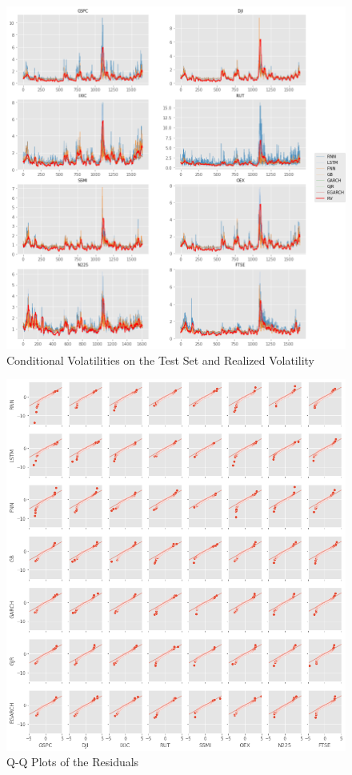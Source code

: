 \documentclass[a4paper, oneside]{discothesis}
\begin{document}
\begin{figure}
    \centering
    \includegraphics[width = 12.4cm]{figures/VOLA_FIGURS.png}
    \caption{Conditional Volatilities on the Test Set and Realized Volatility}
    \label{fig:my_label}
\end{figure}

\begin{figure}
    \centering
    \includegraphics[width = 13.4cm]{figures/QQ_plot.png}
    \caption{ Q-Q Plots of the Residuals}
    \label{fig:my_label}
\end{figure}
\end{document}
